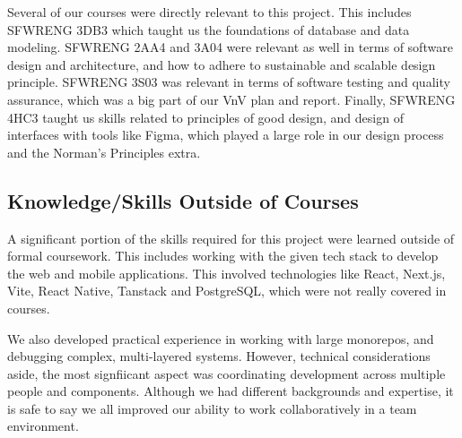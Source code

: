 \documentclass{article}
\begin{document}
Several of our courses were directly relevant to this project. This includes SFWRENG 3DB3 which taught us the foundations of database and data modeling. SFWRENG 2AA4 and 3A04 were relevant as well in terms of software design and architecture, and how to adhere to sustainable and scalable design principle. SFWRENG 3S03 was relevant in terms of software testing and quality assurance, which was a big part of our VnV plan and report. Finally, SFWRENG 4HC3 taught us skills related to principles of good design, and design of interfaces with tools like Figma, which played a large role in our design process and the Norman's Principles extra.

\subsection{Knowledge/Skills Outside of Courses}

A significant portion of the skills required for this project were learned outside of formal coursework. This includes working with the given tech stack to develop the web and mobile applications. This involved technologies like React, Next.js, Vite, React Native, Tanstack and PostgreSQL, which were not really covered in courses.

We also developed practical experience in working with large monorepos, and debugging complex, multi-layered systems. However, technical considerations aside, the most signfiicant aspect was coordinating development across multiple people and components. Although we had different backgrounds and expertise, it is safe to say we all improved our ability to work collaboratively in a team environment.
\end{document}
